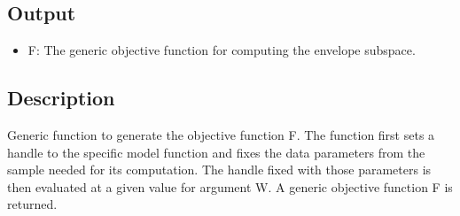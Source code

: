 \documentclass[a4paper,11pt,openany]{memoir}
\begin{document}
\subsection*{Output}

\begin{itemize}
\setlength{\itemsep}{-1ex}
   \item F: The generic objective function for computing the envelope subspace.
\end{itemize}


\subsection*{Description}

\begin{par}
Generic function to generate the objective function F. The function first sets a handle to the specific model function and fixes the data parameters from the sample needed for its computation. The handle fixed with those parameters is then evaluated at a given value for argument W. A generic objective function F is returned.
\end{par} \vspace{1em}
\end{document}
